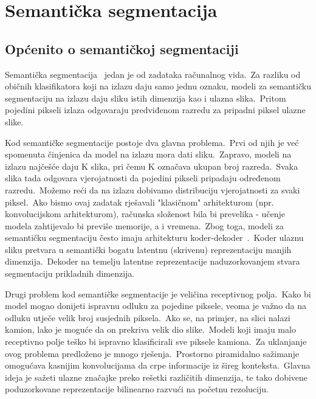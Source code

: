 \documentclass[times, utf8, seminar, numeric]{fer}
\begin{document}
\chapter{Semantička segmentacija}

\section{Općenito o semantičkoj segmentaciji}

Semantička segmentacija~\cite{garcia2017review} jedan je od zadataka računalnog vida.\ 
Za razliku od običnih klasifikatora koji na izlazu daju samo jednu oznaku, modeli za semantičku segmentaciju na izlazu daju sliku istih dimenzija kao i ulazna slika.\ 
Pritom pojedini pikseli izlaza odgovaraju predviđenom razredu za pripadni piksel ulazne slike.\ 

Kod semantičke segmentacije postoje dva glavna problema.\ Prvi od njih je već spomenuta činjenica da model na izlazu mora dati sliku.\ 
Zapravo, modeli na izlazu najčešće daju K slika, pri čemu K označava ukupan broj razreda.\ Svaka slika tada odgovara vjerojatnosti da pojedini pikseli pripadaju određenom razredu.\ 
Možemo reći da na izlazu dobivamo distribuciju vjerojatnosti za svaki piksel.\
Ako bismo ovaj zadatak rješavali "klasičnom" arhitekturom (npr. konvolucijskom arhitekturom), računska složenost bila bi prevelika - učenje modela zahtijevalo bi previše memorije, a i vremena.\
Zbog toga, modeli za semantičku segmentaciju često imaju arhitekturu koder-dekoder~\cite{badrinarayanan2017segnet}.\ 
Koder ulaznu sliku pretvara u semantički bogatu latentnu (skrivenu) reprezentaciju manjih dimenzija.\ 
Dekoder na temelju latentne reprezentacije naduzorkovanjem stvara segmentaciju prikladnih dimenzija.\
  
Drugi problem kod semantičke segmentacije je veličina receptivnog polja.\ 
Kako bi model mogao donijeti ispravnu odluku za pojedine piksele, veoma je važno da na odluku utječe velik broj susjednih piksela.\
Ako se, na primjer, na slici nalazi kamion, lako je moguće da on prekriva velik dio slike.\ 
Modeli koji imaju malo receptivno polje teško bi ispravno klasificirali sve piksele kamiona.\ 
Za uklanjanje ovog problema predloženo je mnogo rješenja.\
Prostorno piramidalno sažimanje~\cite{he2015spatial} omogućava kasnijim konvolucijama da crpe informacije iz šireg konteksta.\
Glavna ideja je sažeti ulazne značajke preko rešetki različitih dimenzija, te tako dobivene poduzorkovane reprezentacije bilinearno razvući na početnu rezoluciju.\
\end{document}
